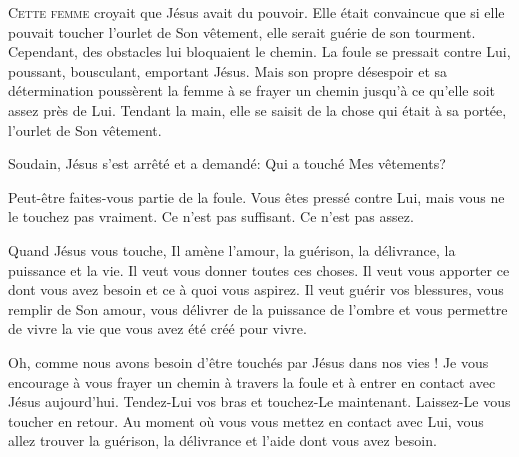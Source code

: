\dvrule







\lettrine{C}{ette femme} croyait que Jésus avait du pouvoir.
 Elle était convaincue que si elle pouvait toucher l'ourlet de Son vêtement,
 elle serait guérie de son tourment. Cependant, des obstacles
 lui bloquaient le chemin. La foule se pressait contre Lui,
 poussant, bousculant, emportant Jésus.
 Mais son propre désespoir et sa détermination poussèrent la femme
 à se frayer un chemin jusqu'à ce qu'elle soit assez près de Lui.
 Tendant la main, elle se saisit de la chose qui était à sa portée,
 l'ourlet de Son vêtement.

Soudain, Jésus s'est arrêté et a demandé: 
 \Og Qui a touché Mes vêtements? \Fg{}


Peut-être faites-vous partie de la foule. Vous êtes pressé contre Lui,
 mais vous ne le touchez pas vraiment. Ce n'est pas suffisant.
 Ce n'est pas assez.

Quand Jésus vous touche, Il amène l'amour, la guérison, la délivrance,
 la puissance et la vie. Il veut vous donner toutes ces choses.
 Il veut vous  apporter ce dont vous avez besoin
 et ce à quoi vous aspirez. Il veut guérir vos blessures,
 vous remplir de Son amour, vous délivrer de la puissance de l'ombre
 et vous permettre de vivre la vie que vous avez été créé pour vivre.

Oh, comme nous avons besoin d'être touchés par Jésus dans nos vies !
 Je vous encourage à vous frayer un chemin à travers la foule
 et à entrer en contact avec Jésus aujourd'hui.
 Tendez-Lui  vos bras et touchez-Le 
 maintenant. Laissez-Le   vous toucher en retour.
 Au moment où vous vous mettez en contact avec Lui,
 vous allez trouver la guérison, la délivrance et l'aide dont vous avez besoin.

